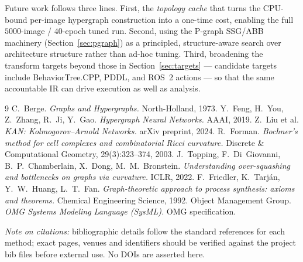 \documentclass[11pt]{article}
\begin{document}
Future work follows three lines. First, the \emph{topology cache} that turns the
CPU-bound per-image hypergraph construction into a one-time cost, enabling the
full $5000$-image / $40$-epoch tuned run. Second, using the P-graph SSG/ABB
machinery (Section~\ref{sec:pgraph}) as a principled, structure-aware search over
architecture structure rather than ad-hoc tuning. Third, broadening the transform
targets beyond those in Section~\ref{sec:targets} --- candidate targets include
BehaviorTree.CPP, PDDL, and ROS~2 actions --- so that the same accountable IR can
drive execution as well as analysis.

\begin{thebibliography}{9}
 C.~Berge. \emph{Graphs and Hypergraphs.} North-Holland, 1973.
 Y.~Feng, H.~You, Z.~Zhang, R.~Ji, Y.~Gao.
  \emph{Hypergraph Neural Networks.} AAAI, 2019.
 Z.~Liu et al.
  \emph{KAN: Kolmogorov--Arnold Networks.} arXiv preprint, 2024.
 R.~Forman.
  \emph{Bochner's method for cell complexes and combinatorial Ricci curvature.}
  Discrete \& Computational Geometry, 29(3):323--374, 2003.
 J.~Topping, F.~Di~Giovanni, B.~P.~Chamberlain, X.~Dong,
  M.~M.~Bronstein. \emph{Understanding over-squashing and bottlenecks on graphs
  via curvature.} ICLR, 2022.
 F.~Friedler, K.~Tarj\'an, Y.~W.~Huang, L.~T.~Fan.
  \emph{Graph-theoretic approach to process synthesis: axioms and theorems.}
  Chemical Engineering Science, 1992.
 Object Management Group.
  \emph{OMG Systems Modeling Language (SysML).} OMG specification.
\end{thebibliography}

\vspace{0.6em}
\noindent\footnotesize\emph{Note on citations:} bibliographic details follow the
standard references for each method; exact pages, venues and identifiers should
be verified against the project bib files before external use. No DOIs are
asserted here.
\end{document}
